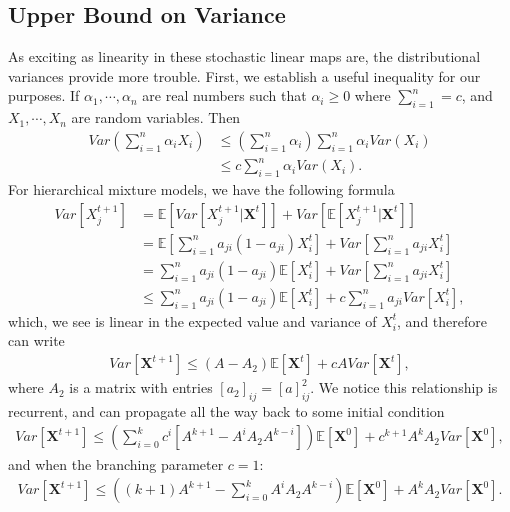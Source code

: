 \documentclass[superscriptaddress]{revtex4-1}
\begin{document}
\subsection{Upper Bound on Variance}
As exciting as linearity in these stochastic linear maps are, the distributional variances provide more trouble. First, we establish a useful inequality for our purposes. If $\alpha_1, \dotsm, \alpha_n$ are real numbers such that $\alpha_i \geq 0$ where $\sum_{i=1}^n = c$, and $X_1, \dotsm, X_n$ are random variables. Then
\begin{align*}
Var \left( \sum_{i=1}^n \alpha_i X_i \right) 
&\leq \left( \sum_{i=1}^n \alpha_i \right) \sum_{i=1}^n \alpha_i Var(X_i)\\
&\leq c \sum_{i=1}^n \alpha_i Var(X_i).
\end{align*}
For hierarchical mixture models, we have the following formula
\begin{align*}
Var[X_j^{t+1}] 
&= 
\mathbb{E}\left[Var\left[X_j^{t+1}|\bm{X}^t\right]\right] +
Var\left[\mathbb{E}\left[X_j^{t+1}|\bm{X}^t\right]\right]\\
&= 
\mathbb{E}\left[\sum_{i=1}^n a_{ji} (1 - a_{ji}) X_i^t \right] +
Var\left[\sum_{i=1}^n a_{ji} X_i^t\right]\\
&=
\sum_{i=1}^n a_{ji} (1 - a_{ji}) \mathbb{E}\left[X_i^t \right] +
Var\left[\sum_{i=1}^n a_{ji} X_i^t\right]\\
&\leq
\sum_{i=1}^n a_{ji} (1 - a_{ji}) \mathbb{E}\left[X_i^t \right] +
c \sum_{i=1}^n a_{ji} Var\left[X_i^t\right],
\end{align*}
which, we see is linear in the expected value and variance of $X_i^t$, and therefore can write
\begin{align*}
Var\left[\bm{X}^{t+1}\right] \leq (A - A_2)\mathbb{E}\left[\bm{X}^t\right] + cAVar\left[\bm{X}^t\right],
\end{align*}
where $A_2$ is a matrix with entries $[a_2]_{ij} = [a]_{ij}^2$. We notice this relationship is recurrent, and can propagate all the way back to some initial condition
\begin{align*}
Var\left[\bm{X}^{t+1}\right] 
\leq 
\left( \sum_{i=0}^k c^i\left[A^{k+1} - A^i A_2 A^{k-i} \right]\right) \mathbb{E}\left[\bm{X}^0\right] + c^{k+1} A^k A_2 Var\left[\bm{X}^0\right],
\end{align*}
and when the branching parameter $c = 1$:
\begin{align*}
Var\left[\bm{X}^{t+1}\right] 
\leq 
\left( (k+1)A^{k+1} - \sum_{i=0}^k A^i A_2 A^{k-i} \right) \mathbb{E}\left[\bm{X}^0\right] +A^k A_2 Var\left[\bm{X}^0\right].
\end{align*}
\end{document}
